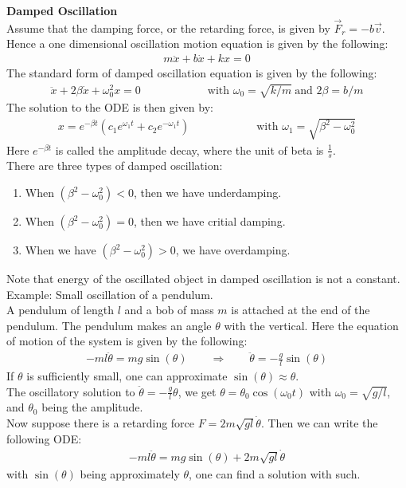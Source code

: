 \documentclass[11pt,oneside]{book}
\theoremstyle{break}
\theoremstyle{break}
\newcommand{\example}{\color{green}Example: \color{black}}
\begin{document}
\newpage
\textbf{Damped Oscillation}\\
Assume that the damping force, or the retarding force, is given by $\vec{F}_r = -b\vec{v}$.\\
Hence a one dimensional oscillation motion equation is given by the following:
\begin{align*}
m\ddot{x}+b\dot{x}+kx=0
\end{align*}
The standard form of damped oscillation equation is given by the following:
\begin{align*}
\ddot{x}+2\beta\dot{x}+\omega_0^2x = 0 \qquad\qquad\qquad\text{with }\omega_0 = \sqrt{k/m}\ \text{and }2\beta = b/m
\end{align*}
The solution to the ODE is then given by:
\begin{align*}
x = e^{-\beta t}(c_1e^{\omega_1 t} + c_2e^{-\omega_1 t}) \qquad\qquad\qquad\text{with }\omega_1 = \sqrt{\beta^2 - \omega_0^2}
\end{align*}
Here $e^{-\beta t}$ is called the amplitude decay, where the unit of beta is $\frac{1}{s}$.\\

There are three types of damped oscillation:
\begin{enumerate}
\item When $(\beta^2 - \omega_0^2)<0$, then we have underdamping.
\item When $(\beta^2-\omega_0^2) = 0$, then we have critial damping.
\item When we have $(\beta^2 - \omega_0^2) >0$, we have overdamping. 
\end{enumerate}
Note that energy of the oscillated object in damped oscillation is not a constant. \\


\example Small oscillation of a pendulum.\\
A pendulum of length $l$ and a bob of mass $m$ is attached at the end of the pendulum. The pendulum makes an angle $\theta$ with the vertical. Here the equation of motion of the system is given by the following:
\begin{align*}
-ml\ddot{\theta} = mg\sin(\theta)\qquad\Rightarrow\qquad
\ddot{\theta} = -\frac{g}{l}\sin(\theta)
\end{align*}
If $\theta$ is sufficiently small, one can approximate $\sin(\theta) \approx \theta$.\\
The oscillatory solution to $\ddot{\theta} = -\frac{g}{l}\theta$, we get $\theta = \theta_0 \cos(\omega_0 t)$ with $\omega_0 = \sqrt{g/l}$, and $\theta_0$ being the amplitude. \\
Now suppose there is a retarding force $F = 2m\sqrt{gl}\dot{\theta}$. Then we can write the following ODE:
\begin{align*}
-ml\ddot{\theta} = mg\sin(\theta) + 2m\sqrt{gl}\dot{\theta}
\end{align*}
with $\sin(\theta)$ being approximately $\theta$, one can find a solution with such.\\
\end{document}
